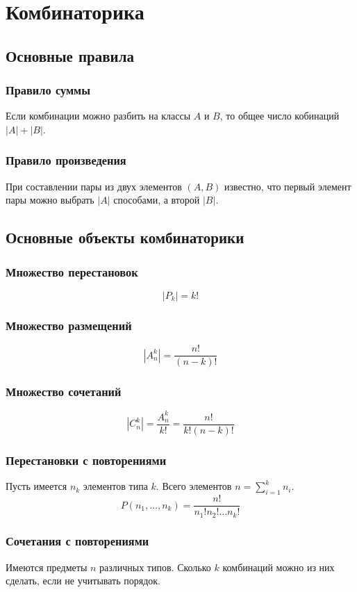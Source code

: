 \documentclass[main]{subfiles}
\begin{document}
\chapter{Комбинаторика}

\section{Основные правила}
\subsection{Правило суммы}
Если комбинации можно разбить на классы $A$ и $B$, то общее число кобинаций 
$|A| + |B|$.

\subsection{Правило произведения}
При составлении пары из двух элементов $(A, B)$ известно, что первый элемент пары
можно выбрать $|A|$ способами, а второй $|B|$.

\section{Основные объекты комбинаторики}
\subsection{Множество перестановок}
\[
    |P_k| = k!
\]

\subsection{Множество размещений}
\[
    |A_n^k| = \frac{n!}{(n - k)!}
\]

\subsection{Множество сочетаний}
\[
    |C_n^k| = \frac{A_n^k}{k!} = \frac{n!}{k!(n - k)!}
\]

\subsection{Перестановки с повторениями}
Пусть имеется $n_k$ элементов типа $k$. Всего элементов $n=\sum_{i = 1}^{k}n_i$.
\[
    P(n_1, \ldots, n_k) = \frac{n!}{n_1!n_2! \ldots n_k!}
\]

\subsection{Сочетания с повторениями}
Имеются предметы $n$ различных типов. Сколько $k$ комбинаций можно из них сделать, 
если не учитывать порядок.
\end{document}
